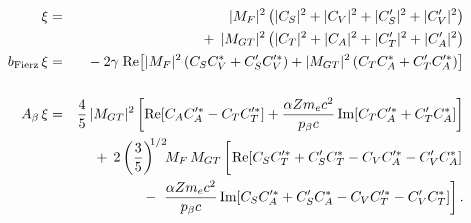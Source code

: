 %
%
%
\begin{eqnarray}
    \xi &=& 
    	|M_F|^2    \left( |C_S|^2 + |C_V|^2 + |C_S^\prime|^2 + |C_V^\prime|^2 \right) 
		\nonumber \\ && + \;\,
		|M_{GT}|^2 \left( |C_T|^2 + |C_A|^2 + |C_T^\prime|^2 + |C_A^\prime|^2 \right)
		\label{eq:jtw_xi_integrated_intro} \\
    \bFierz \, \xi &=& 
    	- \: 2 \gamma \;
		\textrm{Re}\!\left[ |M_F|^2 \left( C_S C_V^* + C_S^\prime C_V^{\prime *} \right) 
    	+ |M_{GT}|^2 \left( C_T C_A^* + C_T^{\prime} C_A^{\prime *} \right) \right] 
		\nonumber \\
    	\label{eq:jtw_bxi_integrated_intro} \\
    \Abeta \, \xi &=& 
    	\frac{4}{5} \, |M_{GT}|^2 \left[ \textrm{Re}\!\left[ C_A C_A^{\prime *} - C_T C_T^{\prime *} \right] + \frac{\alpha Z \me c^2}{\pbeta c} \,\textrm{Im}\!\left[ C_T C_A^{\prime *} + C_T^\prime C_A^* \right] \right] 
		\nonumber \\ && + \;\, 
		2
		\left( \frac{3}{5} \right)^{\!\! 1/2} \!\!
		M_F\,M_{GT}  \left[ \phantom{\frac{1}{1}\!\!\!\!} \textrm{Re} \! \left[ C_S C_T^{\prime *} +  C_S^\prime C_T^* - C_V C_A^{\prime *} - C_V^\prime C_A^* \right] 
		\right.
		\nonumber \\ && - \;
		\left.
		\frac{\alpha Z \me c^2}{\pbeta c} \,\textrm{Im}\!\left[ C_S C_A^{\prime *} + C_S^\prime C_A^* - C_V C_T^{\prime *} -C_V^\prime C_T^* \right] \right].
	\label{eq:jtw_Abetaxi_integrated_intro}
\end{eqnarray}
%
%